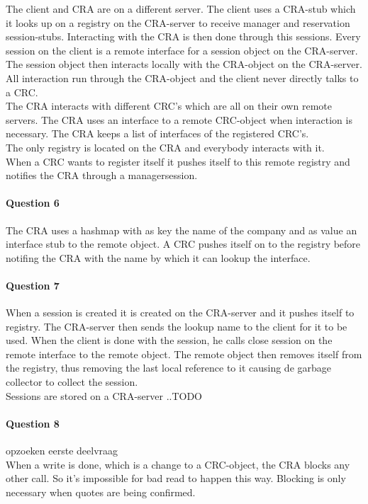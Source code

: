 \documentclass{ds-report}
\begin{document}
	The client and CRA are on a different server. The client uses a CRA-stub which it looks up on a registry on the CRA-server to receive manager and reservation session-stubs. Interacting with the CRA is then done through this sessions. Every session on the client is a remote interface for a session object on the CRA-server. The session object then interacts locally with the CRA-object on the CRA-server. \\
	All interaction run through the CRA-object and the client never directly talks to a CRC. \\
	The CRA interacts with different CRC's which are all on their own remote servers. The CRA uses an interface to a remote CRC-object when interaction is necessary. The CRA keeps a list of interfaces of the registered CRC's. \\
	The only registry is located on the CRA and everybody interacts with it.\\
	When a CRC wants to register itself it pushes itself to this remote registry and notifies the CRA through a managersession. 
	
	\paragraph{Question 6} 
	The CRA uses a hashmap with as key the name of the company and as value an interface stub to the remote object. A CRC pushes itself on to the registry before notifing the CRA with the name by which it can lookup the interface.
	
	\paragraph{Question 7} 
	When a session is created it is created on the CRA-server and it pushes itself to registry. The CRA-server then sends the lookup name to the client for it to be used. When the client is done with the session, he calls close session on the remote interface to the remote object. The remote object then removes itself from the registry, thus removing the last local reference to it causing de garbage collector to collect the session. \\
	Sessions are stored on a CRA-server ..TODO\\
	
	\paragraph{Question 8} 
	opzoeken eerste deelvraag\\
	When a write is done, which is a change to a CRC-object, the CRA blocks any other call. So it's impossible for bad read to happen this way. Blocking is only necessary when quotes are being confirmed.
	
\end{document}
